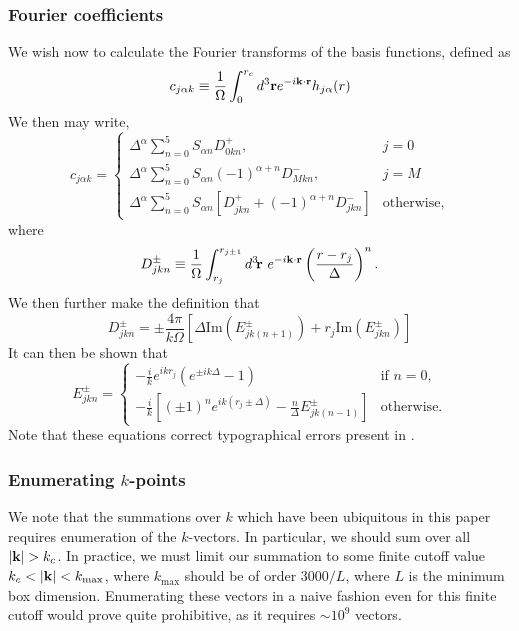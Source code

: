 \subsubsection*{Fourier coefficients}
We wish now to calculate the Fourier transforms of the basis
functions, defined as
\begin{equation}
c_{j\alpha k} \equiv \frac{1}{\Omega} \int_0^{r_c} d^3 \mathbf{r} 
e^{-i \mathbf{k} \cdot \mathbf{r}} h_{j\alpha}(r)
\end{equation}
We then may write,
\begin{equation}
c_{j\alpha k} = 
\begin{cases}
\Delta^\alpha \sum_{n=0}^5 S_{\alpha n} D^+_{0 k n}, & j = 0 \\
\Delta^\alpha \sum_{n=0}^5 S_{\alpha n} (-1)^{\alpha+n} D^-_{M k n}, &
j = M \\
\Delta^\alpha \sum_{n=0}^5 S_{\alpha n} 
\left[ D^+_{j k n} + (-1)^{\alpha+n}D^-_{j k n} \right] & \text{otherwise},
\end{cases}
\end{equation}
where
\begin{equation}
D^{\pm}_{jkn} \equiv \frac{1}{\Omega} \int_{r_j}^{r_{j\pm1}} d^3\!\vr \ 
e^{-i\vk \cdot \vr} \left( \frac{r-r_j}{\Delta}\right)^n.
\end{equation}
We then further make the definition that
\renewcommand{\Im}{\text{Im}}
\begin{equation}
D^{\pm}_{jkn} = \pm \frac{4\pi}{k \Omega} 
\left[ \Delta \Im \left(E^{\pm}_{jk(n+1)}\right) + 
r_j \Im \left(E^{\pm}_{jkn}\right)\right]
\end{equation}
It can then be shown that 
\begin{equation}
E^{\pm}_{jkn} =
\begin{cases}
-\frac{i}{k} e^{ikr_j} \left( e^{\pm i k \Delta} - 1 \right) &
\text{if } n=0, \\
-\frac{i}{k} 
\left[ \left(\pm1\right)^n e^{i k (r_j \pm \Delta)} - \frac{n}{\Delta}
E^\pm_{jk(n-1)}  \right] & \text{otherwise}.
\end{cases}
\end{equation}
Note that these equations correct typographical errors present in \cite{Natoli1995}.
\subsubsection{Enumerating $k$-points}
We note that the summations over $k$ which have been ubiquitous in
this paper requires enumeration of the $k$-vectors.  In particular, we
should sum over all $|\mathbf{k}| > k_c$.  In practice, we must limit our
summation to some finite cutoff value $k_c < |\mathbf{k}| < k_\text{max}$,
where $k_\text{max}$ should be of order $3000/L$, where $L$ is the
minimum box dimension.  Enumerating these vectors in a naive fashion
even for this finite cutoff would prove quite prohibitive, as it
requires $\sim 10^9$ vectors.


